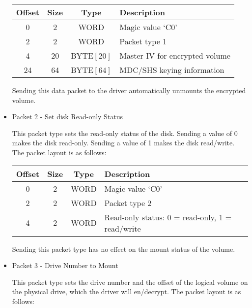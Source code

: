 \begin{itemize}
\begin{center}
\begin{tabular}{|c|c|c|l|}
\hline
    Offset & Size  &  Type       & Description\\
\hline
       0   &   2   &  WORD       & Magic value `C0'\\
       2   &   2   &  WORD       & Packet type 1\\
       4   &  20   &  BYTE$[ 20 ]$ & Master IV for encrypted volume\\
      24   &  64   &  BYTE$[ 64 ]$ & MDC/SHS keying information\\
\hline
\end{tabular}
\end{center}

Sending this data packet to the driver automatically unmounts the encrypted
volume.


\item Packet 2 - Set disk Read-only Status

This packet type sets the read-only status of the disk.  Sending a value of 0
makes the disk read-only.  Sending a value of 1 makes the disk read/write.  The
packet layout is as follows:

\begin{center}
\begin{tabular}{|c|c|c|l|}
\hline
    Offset & Size  &  Type   &     Description\\
\hline
       0   &   2   &  WORD   &     Magic value `C0'\\
       2   &   2   &  WORD   &     Packet type 2\\
       4   &   2   &  WORD   &     Read-only status: 0 = read-only, 1 = read/write\\
\hline
\end{tabular}
\end{center}

Sending this packet type has no effect on the mount status of the volume.


\item Packet 3 - Drive Number to Mount

This packet type sets the drive number and the offset of the logical volume on 
the physical drive, which the driver will en/decrypt.  The packet layout is as 
follows:


\end{itemize}
